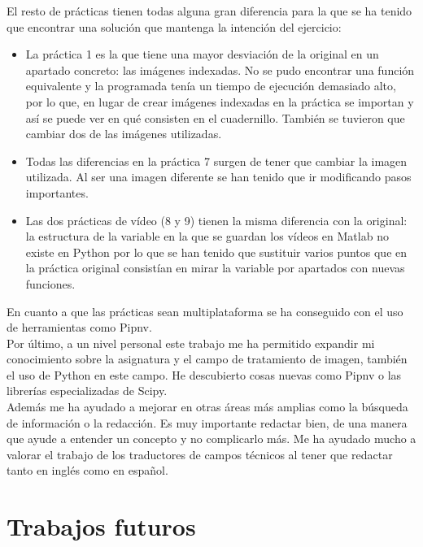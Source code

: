 El resto de prácticas tienen todas alguna gran diferencia para la que se ha tenido que encontrar una solución que mantenga la intención del ejercicio:
\begin{itemize}
    \item La práctica 1 es la que tiene una mayor desviación de la original en un apartado concreto: las imágenes indexadas. No se pudo encontrar una función equivalente y la programada tenía un tiempo de ejecución demasiado alto, por lo que, en lugar de crear imágenes indexadas en la práctica se importan y así se puede ver en qué consisten en el cuadernillo. También se tuvieron que cambiar dos de las imágenes utilizadas.
    
    \item Todas las diferencias en la práctica 7 surgen de tener que cambiar la imagen utilizada. Al ser una imagen diferente se han tenido que ir modificando pasos importantes. 
   
    \item Las dos prácticas de vídeo (8 y 9) tienen la misma diferencia con la original: la estructura de la variable en la que se guardan los vídeos en Matlab no existe en Python por lo que se han tenido que sustituir varios puntos que en la práctica original consistían en mirar la variable por apartados con nuevas funciones.\\ 
\end{itemize}


En cuanto a que las prácticas sean multiplataforma se ha conseguido con el uso de herramientas como Pipnv.\\

Por último, a un nivel personal este trabajo me ha permitido expandir mi conocimiento sobre la asignatura y el campo de tratamiento de imagen, también el uso de Python en este campo. He descubierto cosas nuevas como Pipnv o las librerías especializadas de Scipy. \\

Además me ha ayudado a mejorar en otras áreas más amplias como la búsqueda de información o la redacción. Es muy importante redactar bien, de una manera que ayude a entender un concepto y no complicarlo más. Me ha ayudado mucho a valorar el trabajo de los traductores de campos técnicos al tener que redactar tanto en inglés como en español.

\section{Trabajos futuros}

